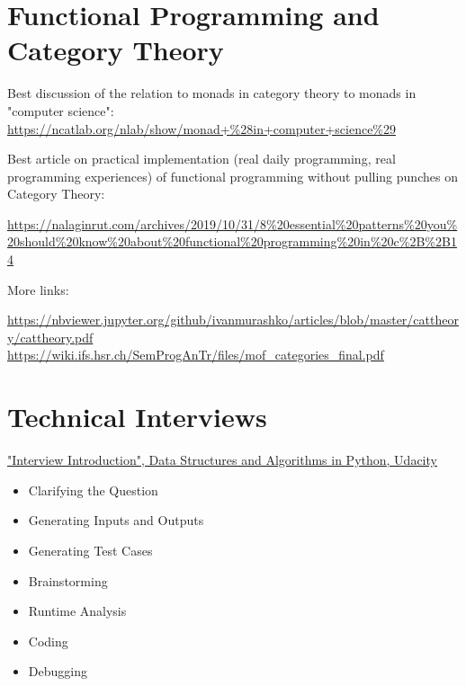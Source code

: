 \documentclass[10pt]{amsart}
\begin{document}
\part{Functional Programming and Category Theory}

Best discussion of the relation to monads in category theory to monads in "computer science": \url{https://ncatlab.org/nlab/show/monad+%28in+computer+science%29}

Best article on practical implementation (real daily programming, real programming experiences) of functional programming without pulling punches on Category Theory:

\url{https://nalaginrut.com/archives/2019/10/31/8%20essential%20patterns%20you%20should%20know%20about%20functional%20programming%20in%20c%2B%2B14}

More links:

\url{https://nbviewer.jupyter.org/github/ivanmurashko/articles/blob/master/cattheory/cattheory.pdf}
\url{https://wiki.ifs.hsr.ch/SemProgAnTr/files/mof_categories_final.pdf}

	
\part{Technical Interviews}

\href{https://classroom.udacity.com/courses/ud513/lessons/7707710408/concepts/77114606610923}{"Interview Introduction", Data Structures and Algorithms in Python, Udacity}

\begin{itemize}
	\item Clarifying the Question
	\item Generating Inputs and Outputs
	\item Generating Test Cases
	\item Brainstorming
	\item Runtime Analysis
	\item Coding
	\item Debugging
\end{itemize}
\end{document}
